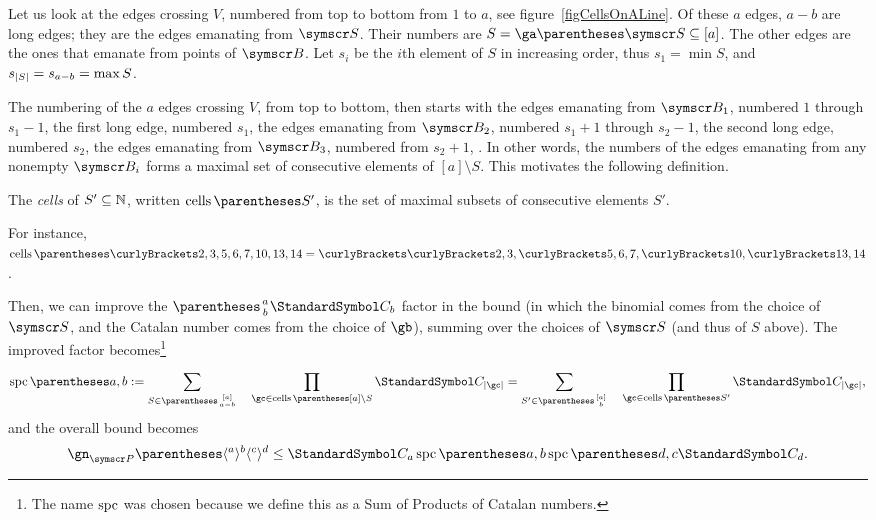 Let us look at the edges crossing $V$, numbered from top to bottom from $1$ to $a$, see
figure~\ref{figCellsOnALine}. Of these $a$ edges,
$a-b$ are long edges; they are the edges emanating from $\pointset S$. 
Their numbers are $S = \ga\of{\pointset S} \Subset [a]$.
The other edges are the ones that emanate from points of $\pointset B$.
Let $s_i$ be the $i$th element of $S$ in increasing order, thus $s_1=\min S$, and
$s_{\left\vert S\right\vert} = s_{a-b} = \max S$.

The numbering of the $a$ edges crossing $V$, from top to bottom, then starts with
the edges emanating from $\pointset B_1$, numbered $1$ through
$s_1-1$, the first long edge, numbered $s_1$, the edges emanating from
$\pointset B_2$, numbered $s_1+1$ through $s_2-1$, the second long edge,
numbered $s_2$, the edges emanating from $\pointset B_3$, numbered from $s_2+1$, \etc.
In other words, the numbers of the edges emanating from any nonempty $\pointset B_i$ forms
a maximal set of consecutive elements of $[a]\setminus S$. This motivates the following
definition.

\begin{definition}
The \emph{cells} of $S'\subseteq \mathbb{N}$, written $\cells\of{S'}$, is the set of maximal subsets of
consecutive elements $S'$.
\end{definition}
For instance, $\cells\of{\set{2,3,5,6,7,10,13,14}}=\set{\set{2,3},\set{5,6,7},\set{10},\set{13,14}}$.

Then, we can improve the $\binom a b \CatalanNumber b$ factor in the bound (in which the binomial comes from
the choice of $\pointset S$, and the Catalan number comes
from the choice of $\gb$), summing over the choices of $\pointset S$ (and thus of $S$ above).
The improved factor becomes\footnote{The name $\operatorname{spc}$ was chosen because we define this as
a Sum of Products of Catalan numbers.}\begin{equation}
\spc\of{a,b}\DefineAs
\sum{S\in\binom{[a]}{a-b}} \quad \prod{\gc\in\cells\of{[a] \setminus S}}\CatalanNumber {\Cardinality \gc} =
\sum{S'\in\binom{[a]}{b}} \quad \prod{\gc\in\cells\of{S'}}\CatalanNumber {\Cardinality \gc}\text,
\label{spcDefinition}
\end{equation}
and the overall bound becomes\begin{equation}
\gn_{\pointset P}\of{\langle^a\rangle^b\langle^c\rangle^d}\leq
\CatalanNumber a\spc\of{a, b}\spc\of{d, c}\CatalanNumber d\text.\label{bound-ck-spckl-spcpq-cp}
\end{equation}

